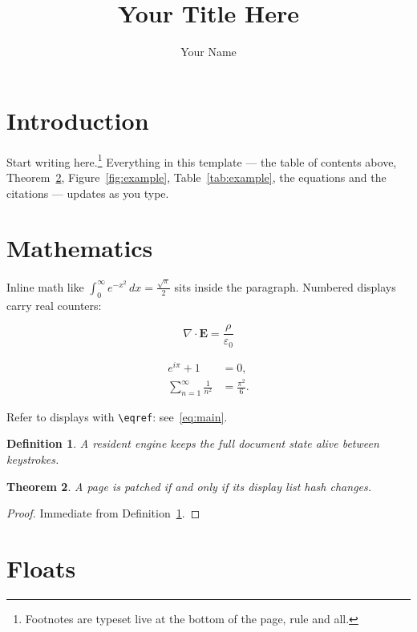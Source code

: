 \documentclass{article}
\title{Your Title Here}
\author{Your Name}
\newtheorem{theorem}{Theorem}[section]
\newtheorem{definition}[theorem]{Definition}
\begin{document}
\maketitle

\tableofcontents

\section{Introduction}
\label{sec:intro}

Start writing here.\footnote{Footnotes are typeset live at the bottom of
the page, rule and all.} Everything in this template --- the table of
contents above, Theorem~\ref{thm:main}, Figure~\ref{fig:example},
Table~\ref{tab:example}, the equations and the citations
\cite{knuth84,lamport94} --- updates as you type.

\section{Mathematics}
\label{sec:math}

Inline math like $\int_0^\infty e^{-x^2}\,dx = \frac{\sqrt{\pi}}{2}$
sits inside the paragraph. Numbered displays carry real counters:

\begin{equation}
  \label{eq:main}
  \nabla \cdot \mathbf{E} = \frac{\rho}{\varepsilon_0}
\end{equation}

\begin{align}
  e^{i\pi} + 1 &= 0, \\
  \sum_{n=1}^{\infty} \frac{1}{n^2} &= \frac{\pi^2}{6}.
\end{align}

Refer to displays with \verb|\eqref|: see~\eqref{eq:main}.

\begin{definition}
  \label{def:example}
  A \emph{resident engine} keeps the full document state alive between
  keystrokes.
\end{definition}

\begin{theorem}
  \label{thm:main}
  A page is patched if and only if its display list hash changes.
\end{theorem}

\begin{proof}
  Immediate from Definition~\ref{def:example}. \qedhere
\end{proof}

\section{Floats}
\label{sec:floats}
\end{document}
